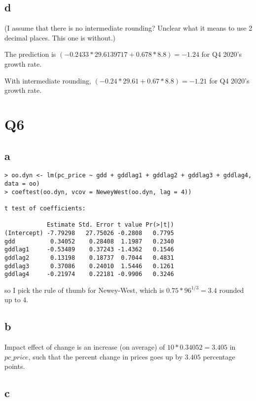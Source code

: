 \documentclass[12pt,letterpaper]{article}
\theoremstyle{definition}
\begin{document}
\subsection*{d}
(I assume that there is no intermediate rounding? Unclear what it means to use 2 decimal places. This one is without.)

The prediction is $(-0.2433 * 29.6139717 + 0.678 * 8.8) = -1.24$ for Q4 2020's growth rate.

With intermediate rounding, $(-0.24 * 29.61 + 0.67 * 8.8) = -1.21$ for Q4 2020's growth rate.

\section*{Q6}
\subsection*{a}

\begin{Verbatim}[fontsize=\small]
> oo.dyn <- lm(pc_price ~ gdd + gddlag1 + gddlag2 + gddlag3 + gddlag4, data = oo)
> coeftest(oo.dyn, vcov = NeweyWest(oo.dyn, lag = 4))

t test of coefficients:

            Estimate Std. Error t value Pr(>|t|)
(Intercept) -7.79298   27.75026 -0.2808   0.7795
gdd          0.34052    0.28408  1.1987   0.2340
gddlag1     -0.53489    0.37243 -1.4362   0.1546
gddlag2      0.13198    0.18737  0.7044   0.4831
gddlag3      0.37086    0.24010  1.5446   0.1261
gddlag4     -0.21974    0.22181 -0.9906   0.3246
\end{Verbatim}
so I pick the rule of thumb for Newey-West, which is $0.75 * 96^{1/3} = 3.4$ rounded up to 4.

\subsection*{b}

Impact effect of change is an increase (on average) of $10 * 0.34052 = 3.405$ in $pc\_price$, such that the percent change in prices goes up by $3.405$ percentage points.

\subsection*{c}
\end{document}
